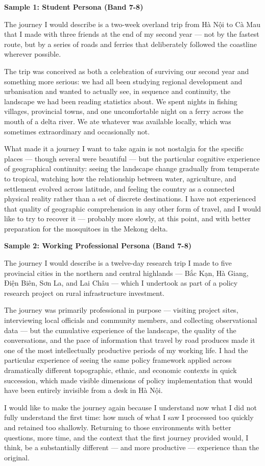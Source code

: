 \begin{ieltsanswer}
\textbf{Sample 1: Student Persona (Band 7-8)}

The journey I would describe is a two-week overland trip from Hà Nội to Cà Mau that I made with three friends at the end of my second year — not by the fastest route, but by a series of roads and ferries that deliberately followed the coastline wherever possible.

The trip was conceived as both a celebration of surviving our second year and something more serious: we had all been studying regional development and urbanisation and wanted to actually see, in sequence and continuity, the landscape we had been reading statistics about. We spent nights in fishing villages, provincial towns, and one uncomfortable night on a ferry across the mouth of a delta river. We ate whatever was available locally, which was sometimes extraordinary and occasionally not.

What made it a journey I want to take again is not nostalgia for the specific places — though several were beautiful — but the particular cognitive experience of geographical continuity: seeing the landscape change gradually from temperate to tropical, watching how the relationship between water, agriculture, and settlement evolved across latitude, and feeling the country as a connected physical reality rather than a set of discrete destinations. I have not experienced that quality of geographic comprehension in any other form of travel, and I would like to try to recover it — probably more slowly, at this point, and with better preparation for the mosquitoes in the Mekong delta.

\textbf{Sample 2: Working Professional Persona (Band 7-8)}

The journey I would describe is a twelve-day research trip I made to five provincial cities in the northern and central highlands — Bắc Kạn, Hà Giang, Điện Biên, Sơn La, and Lai Châu — which I undertook as part of a policy research project on rural infrastructure investment.

The journey was primarily professional in purpose — visiting project sites, interviewing local officials and community members, and collecting observational data — but the cumulative experience of the landscape, the quality of the conversations, and the pace of information that travel by road produces made it one of the most intellectually productive periods of my working life. I had the particular experience of seeing the same policy framework applied across dramatically different topographic, ethnic, and economic contexts in quick succession, which made visible dimensions of policy implementation that would have been entirely invisible from a desk in Hà Nội.

I would like to make the journey again because I understand now what I did not fully understand the first time: how much of what I saw I processed too quickly and retained too shallowly. Returning to those environments with better questions, more time, and the context that the first journey provided would, I think, be a substantially different — and more productive — experience than the original.
\end{ieltsanswer}


